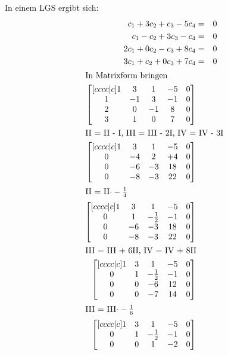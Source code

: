 \documentclass[10pt,a4paper,oneside,ngerman,numbers=noenddot]{scrartcl}
\begin{document}
\subsection{} %
In einem LGS ergibt sich: \\
\begin{alignat*}{2}
c_{1} + 3c_{2} + c_{3} - 5c_{4} &=& 0 \\
c_{1} - c_{2} + 3c_{3} - c_{4} &=& 0 \\
2c_{1} + 0c_{2} - c_{3} + 8c_{4} &=& 0 \\
3c_{1} + c_{2} + 0c_{3} + 7c_{4} &=& 0 \\
\intertext{In Matrixform bringen}
\begin{bmatrix}[cccc|c]
1 & 3 & 1 & -5 & 0 \\
1 & -1 & 3 & -1 & 0 \\
2 & 0 & -1 & 8 & 0 \\
3 & 1 & 0 & 7 & 0
\end{bmatrix} \\
\intertext{II = II - I, III = III - 2I, IV = IV - 3I}
\begin{bmatrix}[cccc|c]
1 & 3 & 1 & -5 & 0 \\
0 & -4 & 2 & +4 & 0 \\
0 & -6 & -3 & 18 & 0 \\
0 & -8 & -3 & 22 & 0
\end{bmatrix} \\
\intertext{II = II$ \cdot -\frac{1}{4}$}
\begin{bmatrix}[cccc|c]
1 & 3 & 1 & -5 & 0 \\
0 & 1 & -\frac{1}{2} & -1 & 0 \\
0 & -6 & -3 & 18 & 0 \\
0 & -8 & -3 & 22 & 0
\end{bmatrix} \\
\intertext{III = III + 6II, IV = IV + 8II}
\begin{bmatrix}[cccc|c]
1 & 3 & 1 & -5 & 0 \\
0 & 1 & -\frac{1}{2} & -1 & 0 \\
0 & 0 & -6 & 12 & 0 \\
0 & 0 & -7 & 14 & 0
\end{bmatrix} \\
\intertext{III = III$ \cdot -\frac{1}{6}$}
\begin{bmatrix}[cccc|c]
1 & 3 & 1 & -5 & 0 \\
0 & 1 & -\frac{1}{2} & -1 & 0 \\
0 & 0 & 1 & -2 & 0 \\

\end{bmatrix}
\end{alignat*}
\end{document}
